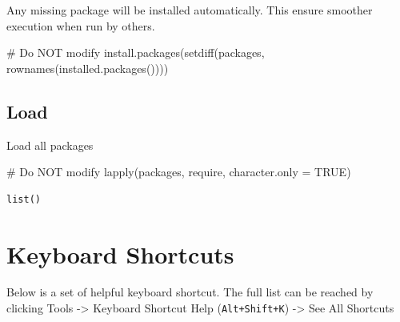 \documentclass[
  letterpaper,
  DIV=11,
  numbers=noendperiod]{scrreprt}
\newenvironment{Shaded}{\begin{snugshade}}{\end{snugshade}}
\newcommand{\AttributeTok}[1]{\textcolor[rgb]{0.40,0.45,0.13}{#1}}
\newcommand{\CommentTok}[1]{\textcolor[rgb]{0.37,0.37,0.37}{#1}}
\newcommand{\ConstantTok}[1]{\textcolor[rgb]{0.56,0.35,0.01}{#1}}
\newcommand{\FunctionTok}[1]{\textcolor[rgb]{0.28,0.35,0.67}{#1}}
\newcommand{\NormalTok}[1]{\textcolor[rgb]{0.00,0.23,0.31}{#1}}
\begin{document}
Any missing package will be installed automatically. This ensure
smoother execution when run by others.

\begin{Shaded}
\begin{Highlighting}[]
\CommentTok{\# Do NOT modify}
\FunctionTok{install.packages}\NormalTok{(}\FunctionTok{setdiff}\NormalTok{(packages, }\FunctionTok{rownames}\NormalTok{(}\FunctionTok{installed.packages}\NormalTok{())))}
\end{Highlighting}
\end{Shaded}

\subsection*{Load}\label{load-2}

Load all packages

\begin{Shaded}
\begin{Highlighting}[]
\CommentTok{\# Do NOT modify}
\FunctionTok{lapply}\NormalTok{(packages, require, }\AttributeTok{character.only =} \ConstantTok{TRUE}\NormalTok{)}
\end{Highlighting}
\end{Shaded}

\begin{verbatim}
list()
\end{verbatim}

\section{Keyboard Shortcuts}\label{keyboard-shortcuts}

Below is a set of helpful keyboard shortcut. The full list can be
reached by clicking Tools -\textgreater{} Keyboard Shortcut Help
(\texttt{Alt+Shift+K}) -\textgreater{} See All Shortcuts
\end{document}
